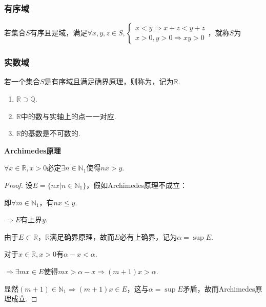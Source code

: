 \subsubsection{有序域}
\begin{definition}
    若集合$S$有序且是域，满足$\forall x,y,z \in S, \begin{cases}
        x<y \Rightarrow x+z < y+z\\
        x>0, y>0 \Rightarrow xy>0
    \end{cases}$，就称$S$为
\end{definition}

\subsubsection{实数域}
\begin{definition}
    若一个集合$S$是有序域且满足确界原理，则称为，记为$\mathbb{R}$.
\end{definition}

\begin{enumerate}[property]
    \item $\mathbb{R}\supset\mathbb{Q}$.
    \item $\mathbb{R}$中的数与实轴上的点一一对应.
    \item $\mathbb{R}$的基数是不可数的.
\end{enumerate}

\begin{theorem}
    \textbf{Archimedes原理}

    $\forall x \in \mathbb{R}, x>0$必定$\exists n \in \mathbb{N}_1$使得$nx>y$.
\end{theorem}

\begin{proof}
    设$E = \{nx | n \in \mathbb{N}_1\}$，假如Archimedes原理不成立：
    
    即$\forall m \in \mathbb{N}_1$，有$nx \leqslant y$.

    $\Rightarrow E$有上界$y$.

    由于$E \subset \mathbb{R}$，$\mathbb{R}$满足确界原理，故而$E$必有上确界，记为$\alpha = \sup E$.

    对于$x \in \mathbb{R}, x>0$有$\alpha - x < \alpha$.

    $\Rightarrow \exists mx \in E$使得$mx > \alpha - x \Rightarrow (m+1)x > \alpha$.

    显然$(m+1) \in \mathbb{N}_1 \Rightarrow (m+1)x \in E$，这与$\alpha = \sup E$矛盾，故而Archimedes原理成立.
\end{proof}

